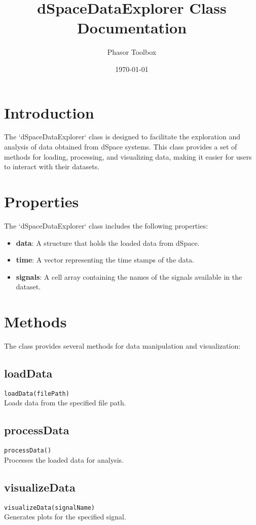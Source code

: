 \documentclass{article}
\title{dSpaceDataExplorer Class Documentation}
\author{Phasor Toolbox}
\date{\today}
\begin{document}
\maketitle

\section{Introduction}
The `dSpaceDataExplorer` class is designed to facilitate the exploration and analysis of data obtained from dSpace systems. This class provides a set of methods for loading, processing, and visualizing data, making it easier for users to interact with their datasets.

\section{Properties}
The `dSpaceDataExplorer` class includes the following properties:

\begin{itemize}
    \item \textbf{data}: A structure that holds the loaded data from dSpace.
    \item \textbf{time}: A vector representing the time stamps of the data.
    \item \textbf{signals}: A cell array containing the names of the signals available in the dataset.
\end{itemize}

\section{Methods}
The class provides several methods for data manipulation and visualization:

\subsection{loadData}
\texttt{loadData(filePath)} \\
Loads data from the specified file path.

\subsection{processData}
\texttt{processData()} \\
Processes the loaded data for analysis.

\subsection{visualizeData}
\texttt{visualizeData(signalName)} \\
Generates plots for the specified signal.
\end{document}
